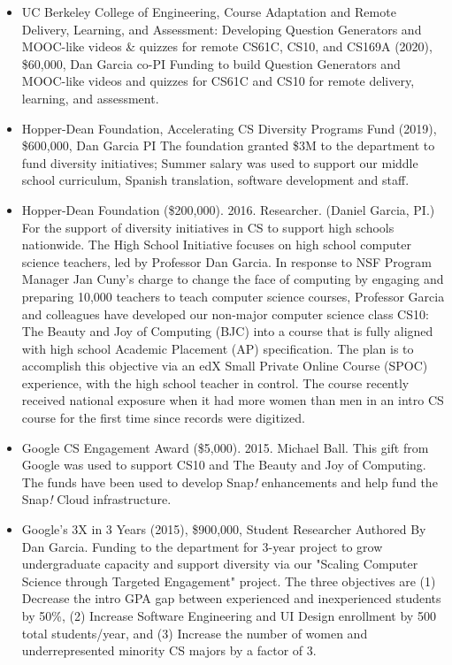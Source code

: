\begin{itemize}
    \item{UC Berkeley College of Engineering, Course Adaptation and Remote Delivery, Learning, and Assessment: Developing Question Generators and MOOC-like videos \& quizzes for remote CS61C, CS10, and CS169A (2020), \$60,000, Dan Garcia co-PI
    Funding to build Question Generators and MOOC-like videos and quizzes for CS61C and CS10 for remote delivery, learning, and assessment.
    }
    
    \item{Hopper-Dean Foundation, Accelerating CS Diversity Programs Fund (2019), \$600,000, Dan Garcia PI
    The foundation granted \$3M to the department to fund diversity initiatives;  Summer salary was used to support our middle school curriculum, Spanish translation, software development and staff.
    }

    \item{Hopper-Dean Foundation (\$200,000). 2016. Researcher. (Daniel Garcia, PI.)}
    \newline\small{For the support of diversity initiatives in CS to support high schools nationwide. The High School Initiative focuses on high school computer science teachers, led by Professor Dan Garcia. In response to NSF Program Manager Jan Cuny’s charge to change the face of computing by engaging and preparing 10,000 teachers to teach computer science courses, Professor Garcia and colleagues have developed our non-major computer science class CS10: The Beauty and Joy of Computing (BJC) into a course that is fully aligned with high school Academic Placement (AP) specification. The plan is to accomplish this objective via an edX Small Private Online Course (SPOC) experience, with the high school teacher in control. The course recently received national exposure when it had more women than men in an intro CS course for the first time since records were digitized.}

    \item{Google CS Engagement Award (\$5,000). 2015. Michael Ball.}
    \newline\small{This gift from Google was used to support CS10 and The Beauty and Joy of Computing. The funds have been used to develop Snap\textit{!} enhancements and help fund the Snap\textit{!} Cloud infrastructure.}
    
    \item{Google’s 3X in 3 Years (2015), \$900,000, Student  Researcher
    Authored By Dan Garcia. Funding to the department for 3-year project to grow undergraduate capacity and support diversity via our "Scaling Computer Science through Targeted Engagement" project. The three objectives are (1) Decrease the intro GPA gap between experienced and inexperienced students by 50\%, (2) Increase Software Engineering and UI Design enrollment by 500 total students/year, and (3) Increase the number of women and underrepresented minority CS majors by a factor of 3.}
    

\end{itemize}
